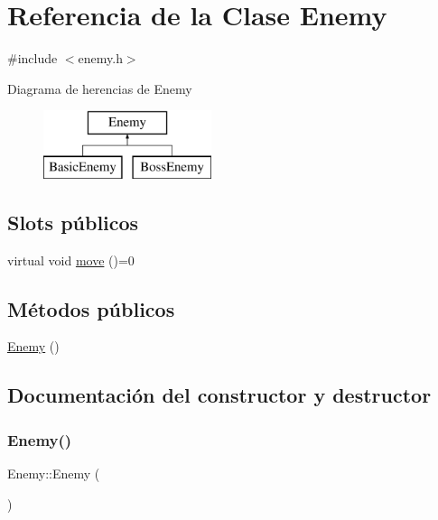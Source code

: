 \hypertarget{class_enemy}{}\section{Referencia de la Clase Enemy}
\label{class_enemy}


{\ttfamily \#include $<$enemy.\+h$>$}

Diagrama de herencias de Enemy\begin{figure}[H]
\begin{center}
\leavevmode
\includegraphics[height=2.000000cm]{class_enemy}
\end{center}
\end{figure}
\subsection*{Slots públicos}
\begin{DoxyCompactItemize}
\item 
virtual void \hyperlink{class_enemy_a1c208ac4a80b892f9692222bcb96f6ae}{move} ()=0
\end{DoxyCompactItemize}
\subsection*{Métodos públicos}
\begin{DoxyCompactItemize}
\item 
\hyperlink{class_enemy_a94f30d348b6d2840fd71675472ba38dd}{Enemy} ()
\end{DoxyCompactItemize}


\subsection{Documentación del constructor y destructor}
\hypertarget{class_enemy_a94f30d348b6d2840fd71675472ba38dd}{}\label{class_enemy_a94f30d348b6d2840fd71675472ba38dd} 
\subsubsection{\texorpdfstring{Enemy()}{Enemy()}}
{\footnotesize\ttfamily Enemy\+::\+Enemy (\begin{DoxyParamCaption}{ }\end{DoxyParamCaption})}



